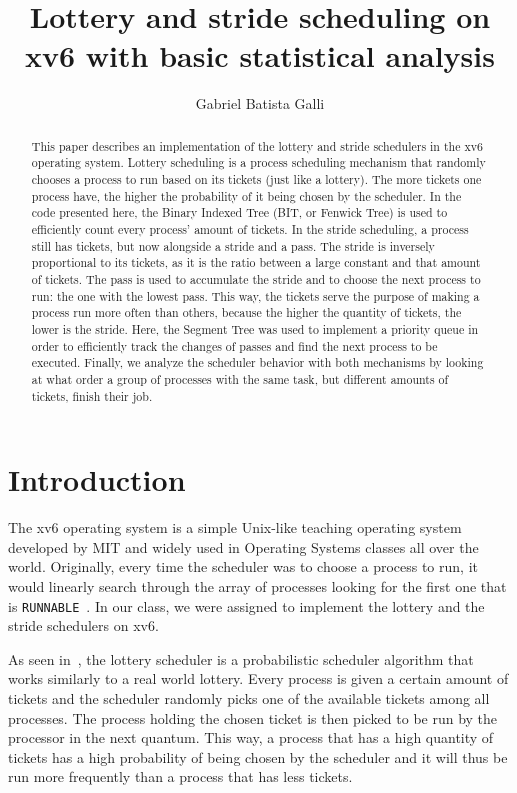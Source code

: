 \documentclass[12pt]{article}
\title{Lottery and stride scheduling on xv6 with basic statistical analysis}
\author{Gabriel Batista Galli\inst{1}}
\begin{document}
\maketitle

\begin{abstract}
This paper describes an implementation of the lottery and stride schedulers in the xv6 operating system. Lottery scheduling is a process scheduling mechanism that randomly chooses a process to run based on its tickets (just like a lottery). The more tickets one process have, the higher the probability of it being chosen by the scheduler. In the code presented here, the Binary Indexed Tree (BIT, or Fenwick Tree) is used to efficiently count every process' amount of tickets. In the stride scheduling, a process still has tickets, but now alongside a stride and a pass. The stride is inversely proportional to its tickets, as it is the ratio between a large constant and that amount of tickets. The pass is used to accumulate the stride and to choose the next process to run: the one with the lowest pass. This way, the tickets serve the purpose of making a process run more often than others, because the higher the quantity of tickets, the lower is the stride. Here, the Segment Tree was used to implement a priority queue in order to efficiently track the changes of passes and find the next process to be executed. Finally, we analyze the scheduler behavior with both mechanisms by looking at what order a group of processes with the same task, but different amounts of tickets, finish their job.
\end{abstract}

\section{Introduction}
The xv6 operating system is a simple Unix-like teaching operating system developed by MIT and widely used in Operating Systems classes all over the world. Originally, every time the scheduler was to choose a process to run, it would linearly search through the array of processes looking for the first one that is \texttt{RUNNABLE}~\cite{xv6book}. In our class, we were assigned to implement the lottery and the stride schedulers on xv6.

As seen in~\cite{waldspurger:94}, the lottery scheduler is a probabilistic scheduler algorithm that works similarly to a real world lottery. Every process is given a certain amount of tickets and the scheduler randomly picks one of the available tickets among all processes. The process holding the chosen ticket is then picked to be run by the processor in the next quantum. This way, a process that has a high quantity of tickets has a high probability of being chosen by the scheduler and it will thus be run more frequently than a process that has less tickets.
\end{document}
